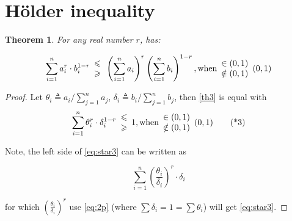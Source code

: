 \documentclass[12pt,a4paper,reqno]{amsart}
\theoremstyle{plain}
\newtheorem{Th}{Theorem}
\theoremstyle{definition}
\begin{document}
\section{H\"older inequality}

\begin{Th} \label{th3} 
  For any real number $r$, has: 
 
  \begin{equation}
    \sum^n_{i=1} a_i^r\cdot b_i^{1-r} 
      \begin{array}{c}
        \leqslant \\ 
        \geqslant  
      \end{array}
    \left (\sum_{i=1}^n a_i \right)^r  
    \left (\sum_{i=1}^n b_i \right)^{1-r}, \textnormal{when} 
    \begin{array}{l}
    \in (0,1) \\  
    \notin(0, 1)     
    \end{array}
    (0, 1)
  \end{equation}

\end{Th}

\begin{proof}
Let $\theta_i\triangleq a_i/\sum_{j=1}^n a_j$, $\delta_i\triangleq b_i/\sum_{j=1}^n b_j$, then \eqref{th3} is equal with 
\begin{equation}\label{eq:star3}
  \sum^n_{i=1} \theta_i^r\cdot \delta_i^{1-r} 
      \begin{array}{c}
        \leqslant \\ 
        \geqslant  
      \end{array} 
    1, \textnormal{when} 
    \begin{array}{l}
    \in (0,1) \\  
    \notin(0, 1)     
    \end{array}
    (0, 1) \tag{*3}
\end{equation}

Note, the left side of \eqref{eq:star3} can be written as 

$$\sum_{i=1}^n \left( \frac{\theta_i}{\delta_i} \right)^r \cdot \delta_i $$ 

for which $\left( \frac{\theta_i}{\delta_i} \right)^r$ use \eqref{eq:2p} (where $\sum\delta_i = 1 = \sum\theta_i$) will get \eqref{eq:star3}. 
\end{proof}
\end{document}
